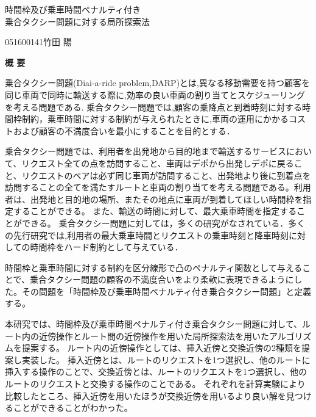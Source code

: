 \begin{center}
{\LARGE 時間枠及び乗車時間ペナルティ付き\\乗合タクシー問題に対する局所探索法}\\[0.5cm]
\end{center}
\hfill
{\large 051600141\qquad 竹田 陽}\\[0.5cm]
\begin{center}
{\Large \bf 概 要}\\
\end{center}


乗合タクシー問題(Diai-a-ride problem,DARP)とは,異なる移動需要を持つ顧客を同じ車両で同時に輸送する際に,効率の良い車両の割り当てとスケジューリングを考える問題である. 乗合タクシー問題では,顧客の乗降点と到着時刻に対する時間枠制約，乗車時間に対する制約が与えられたときに,車両の運用にかかるコストおよび顧客の不満度合いを最小にすることを目的とする．

乗合タクシー問題では、利用者を出発地から目的地まで輸送するサービスにおいて、リクエスト全ての点を訪問すること、車両はデポから出発しデポに戻ること、リクエストのペアは必ず同じ車両が訪問すること、出発地より後に到着点を訪問することの全てを満たすルートと車両の割り当てを考える問題である。利用者は、出発地と目的地の場所、またその地点に車両が到着してほしい時間枠を指定することができる。
また、輸送の時間に対して、最大乗車時間を指定することができる。
乗合タクシー問題に対しては，多くの研究がなされている．多くの先行研究では,利用者の最大乗車時間とリクエストの乗車時刻と降車時刻に対しての時間枠をハード制約として与えている．

時間枠と乗車時間に対する制約を区分線形で凸のペナルティ関数として与えることで、乗合タクシー問題の顧客の不満度合いをより柔軟に表現できるようにした。その問題を「時間枠及び乗車時間ペナルティ付き乗合タクシー問題」と定義する。

本研究では、時間枠及び乗車時間ペナルティ付き乗合タクシー問題に対して、ルート内の近傍操作とルート間の近傍操作を用いた局所探索法を用いたアルゴリズムを提案する。
ルート内の近傍操作としては、挿入近傍と交換近傍の2種類を提案し実装した。
挿入近傍とは、ルートのリクエストを1つ選択し、他のルートに挿入する操作のことで、交換近傍とは、ルートのリクエストを1つ選択し、他のルートのリクエストと交換する操作のことである。
それぞれを計算実験により比較したところ、挿入近傍を用いたほうが交換近傍を用いるより良い解を見つけることができることがわかった。
